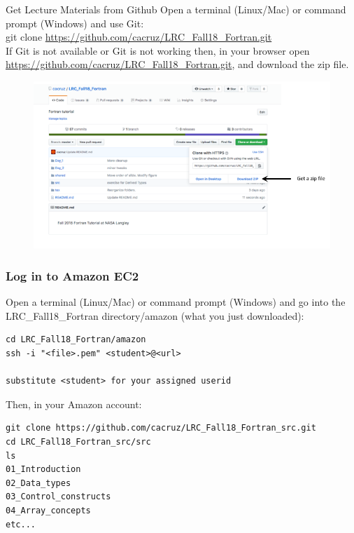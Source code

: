 \documentclass[11pt]{beamer}
\begin{document}
\begin{frame}{Get Lecture Materials from Github}
\footnotesize{Open a terminal (Linux/Mac) or command prompt (Windows) and use Git:\\}
\footnotesize{\quad git clone \url{https://github.com/cacruz/LRC_Fall18_Fortran.git}}\\
\vspace{5mm}
If Git is not available or Git is not working then, in your browser open \url{https://github.com/cacruz/LRC_Fall18_Fortran.git}, and download the zip file.
\begin{figure}[t]
\centering
\includegraphics[scale=.25]{../../shared/github_zip}
\end{figure}

\end{frame}


\begin{frame}[fragile]
\frametitle{Log in to Amazon EC2}

\footnotesize{Open a terminal (Linux/Mac) or command prompt (Windows) and go into the LRC\_Fall18\_Fortran directory/amazon (what you just downloaded):}

\scriptsize{
\begin{Verbatim} 
cd LRC_Fall18_Fortran/amazon
ssh -i "<file>.pem" <student>@<url>

substitute <student> for your assigned userid
\end{Verbatim}
}
\footnotesize{Then, in your Amazon account:}
\scriptsize{
\begin{Verbatim} 
git clone https://github.com/cacruz/LRC_Fall18_Fortran_src.git
cd LRC_Fall18_Fortran_src/src
ls
01_Introduction
02_Data_types
03_Control_constructs
04_Array_concepts
etc...
\end{Verbatim}
}

\end{frame}
\end{document}
